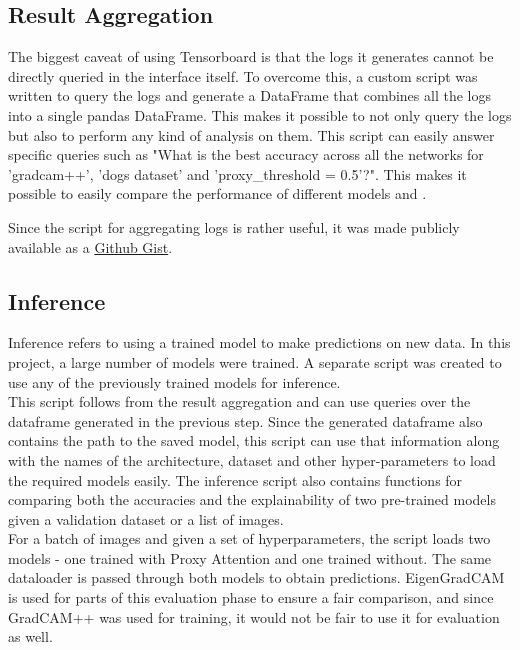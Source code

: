 \subsection{Result Aggregation} \label{sec:result_aggregation}
The biggest caveat of using Tensorboard is that the logs it generates cannot be directly queried in the interface itself. To overcome this, a custom script was written to query the logs and generate a DataFrame that combines all the logs into a single pandas DataFrame. This makes it possible to not only query the logs but also to perform any kind of analysis on them. This script can easily answer specific queries such as "What is the best accuracy across all the networks for 'gradcam++', 'dogs dataset' and 'proxy\_threshold = 0.5'?". This makes it possible to easily compare the performance of different models and .

Since the script for aggregating logs is rather useful, it was made publicly available as a \href{https://gist.github.com/SubhadityaMukherjee/58cbdf324812175233e91993b720e0bc}{Github Gist}.

\subsection{Inference}
Inference refers to using a trained model to make predictions on new data. In this project, a large number of models were trained. A separate script was created to use any of the previously trained models for inference.\\
This script follows from the result aggregation and can use queries over the dataframe generated in the previous step. Since the generated dataframe also contains the path to the saved model, this script can use that information along with the names of the architecture, dataset and other hyper-parameters to load the required models easily.
The inference script also contains functions for comparing both the accuracies and the explainability of two pre-trained models given a validation dataset or a list of images.\\
For a batch of images and given a set of hyperparameters, the script loads two models - one trained with Proxy Attention and one trained without. The same dataloader is passed through both models to obtain predictions. EigenGradCAM is used for parts of this evaluation phase to ensure a fair comparison, and since GradCAM++ was used for training, it would not be fair to use it for evaluation as well. 
